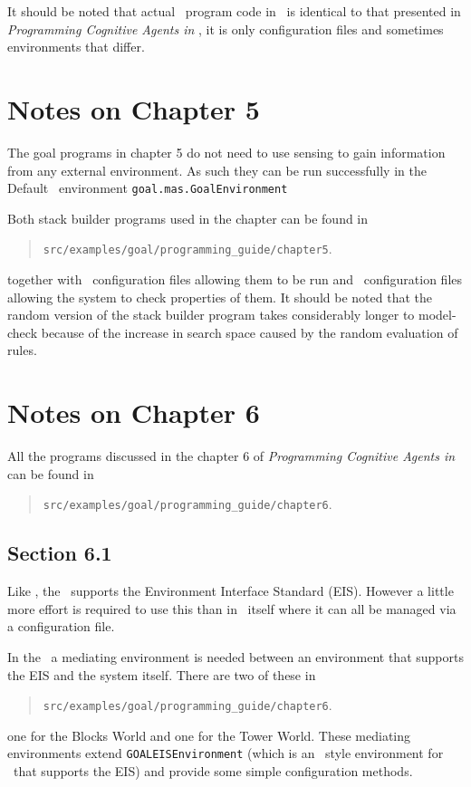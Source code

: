 It should be noted that actual \goal\ program code in \ail\ is identical to that presented in \emph{Programming Cognitive Agents in \goal}, it is only configuration files and sometimes environments that differ.

\section{Notes on Chapter 5}
The goal programs in chapter 5 do not need to use sensing to gain information from any external environment.  As such they can be run successfully in the Default \goal\ environment \texttt{goal.mas.GoalEnvironment}

Both stack builder programs used in the chapter can be found in
\begin{quote}
  \texttt{src/examples/goal/programming\_guide/chapter5}.
\end{quote}
together with \ail\ configuration files allowing them to be run and \ajpf\ configuration files allowing the system to check properties of them.  It should be noted that the random version of the stack builder program takes considerably longer to model-check because of the increase in search space caused by the random evaluation of rules.

\section{Notes on Chapter 6}

All the programs discussed in the chapter 6 of \emph{Programming Cognitive Agents in \goal} can be found in
\begin{quote}
  \texttt{src/examples/goal/programming\_guide/chapter6}.
\end{quote}

\subsection{Section 6.1}
Like \goal, the \ail\ supports the Environment Interface Standard (EIS).  However a little more effort is required to use this than in \goal\ itself where it can all be managed via a configuration file.

In the \ail\ a mediating environment is needed between an environment that supports the EIS and the system itself.  There are two of these in 
\begin{quote}
  \texttt{src/examples/goal/programming\_guide/chapter6}.
\end{quote}
one for the Blocks World and one for the Tower World.  These mediating environments extend \texttt{GOALEISEnvironment} (which is an \ail\ style environment for \goal\ that supports the EIS) and provide some simple configuration methods.

